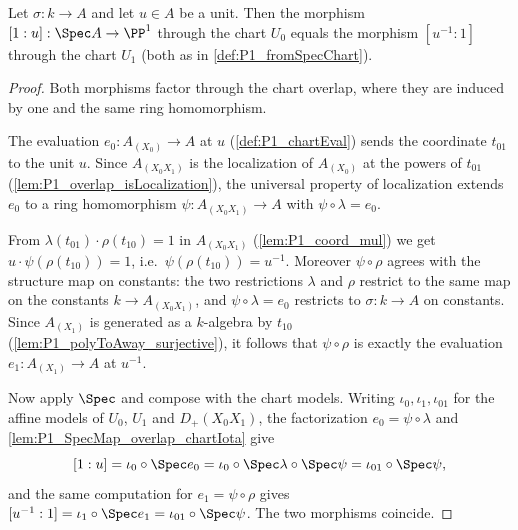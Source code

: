 \begin{theorem}
  \label{thm:P1_gluing_identity}
  \leanok
  Let \(\sigma : k \to A\) and let \(u \in A\) be a unit. Then the morphism
  \([1 : u] : \Spec A \to \PP^1\) through the chart \(U_0\) equals the morphism
  \([u^{-1} : 1]\) through the chart \(U_1\) (both as in \ref{def:P1_fromSpecChart}).
\end{theorem}
\begin{proof}
  \leanok
  Both morphisms factor through the chart overlap, where they are induced by one and the
  same ring homomorphism.

  The evaluation \(e_0 : A_{(X_0)} \to A\) at \(u\) (\ref{def:P1_chartEval}) sends the
  coordinate \(t_{01}\) to the unit \(u\). Since \(A_{(X_0X_1)}\) is the localization of
  \(A_{(X_0)}\) at the powers of \(t_{01}\) (\ref{lem:P1_overlap_isLocalization}), the
  universal property of localization extends \(e_0\) to a ring homomorphism
  \(\psi : A_{(X_0X_1)} \to A\) with \(\psi \circ \lambda = e_0\).

  From \(\lambda(t_{01}) \cdot \rho(t_{10}) = 1\) in \(A_{(X_0X_1)}\)
  (\ref{lem:P1_coord_mul}) we get \(u \cdot \psi(\rho(t_{10})) = 1\), i.e.\
  \(\psi(\rho(t_{10})) = u^{-1}\). Moreover \(\psi \circ \rho\) agrees with the structure
  map on constants: the two restrictions \(\lambda\) and \(\rho\) restrict to the same map
  on the constants \(k \to A_{(X_0X_1)}\), and \(\psi \circ \lambda = e_0\) restricts to
  \(\sigma : k \to A\) on constants. Since \(A_{(X_1)}\) is generated as a \(k\)-algebra by
  \(t_{10}\) (\ref{lem:P1_polyToAway_surjective}), it follows that \(\psi \circ \rho\) is
  exactly the evaluation \(e_1 : A_{(X_1)} \to A\) at \(u^{-1}\).

  Now apply \(\Spec\) and compose with the chart models. Writing \(\iota_0, \iota_1,
  \iota_{01}\) for the affine models of \(U_0\), \(U_1\) and \(D_+(X_0X_1)\), the
  factorization \(e_0 = \psi \circ \lambda\) and \ref{lem:P1_SpecMap_overlap_chartIota}
  give
  \[
    [1 : u]
      = \iota_0 \circ \Spec e_0
      = \iota_0 \circ \Spec \lambda \circ \Spec \psi
      = \iota_{01} \circ \Spec \psi ,
  \]
  and the same computation for \(e_1 = \psi \circ \rho\) gives
  \([u^{-1} : 1] = \iota_1 \circ \Spec e_1 = \iota_{01} \circ \Spec \psi\). The two
  morphisms coincide.
\end{proof}

